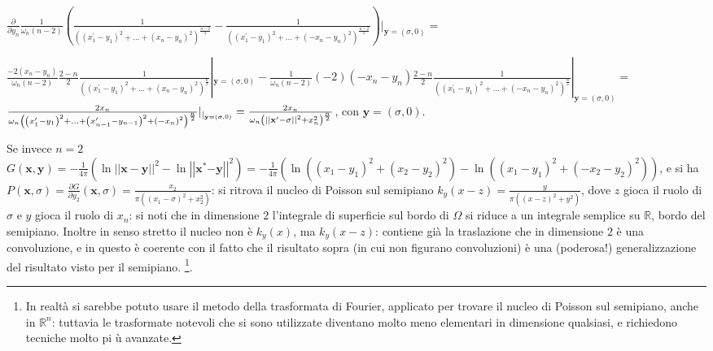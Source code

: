 \documentclass{article}
\begin{document}
$\frac{\partial }{\partial y_{n}}\frac{1}{\omega _{n}\left( n-2\right) }%
\left( \frac{1}{\left( \left( x_{1}^{\prime }-y_{1}\right) ^{2}+...+\left(
x_{n}-y_{n}\right) ^{2}\right) ^{\frac{n-2}{2}}}-\frac{1}{\left( \left(
x_{1}^{\prime }-y_{1}\right) ^{2}+...+\left( -x_{n}-y_{n}\right) ^{2}\right)
^{\frac{n-2}{2}}}\right) |_{\mathbf{y}=\left( \sigma ,0\right) }=$

$\frac{-2\left( x_{n}-y_{n}\right) }{\omega _{n}\left( n-2\right) }\frac{2-n%
}{2}\frac{1}{\left( \left( x_{1}^{\prime }-y_{1}\right) ^{2}+...+\left(
x_{n}-y_{n}\right) ^{2}\right) ^{\frac{n}{2}}}|_{\mathbf{y}=\left( \sigma
,0\right) }-\frac{1}{\omega _{n}\left( n-2\right) }\left( -2\right) \left(
-x_{n}-y_{n}\right) \frac{2-n}{2}\frac{1}{\left( \left( x_{1}^{\prime
}-y_{1}\right) ^{2}+...+\left( -x_{n}-y_{n}\right) ^{2}\right) ^{\frac{n}{2}}%
}|_{\mathbf{y}=\left( \sigma ,0\right) }=$ $\frac{2x_{n}}{\omega _{n}\left(
\left( x_{1}^{\prime }-y_{1}\right) ^{2}+...+\left( x_{n-1}^{\prime
}-y_{n-1}\right) ^{2}+\left( -x_{n}\right) ^{2}\right) ^{\frac{n}{2}}}|_{|_{%
\mathbf{y}=\left( \sigma ,0\right) }}=\frac{2x_{n}}{\omega _{n}\left(
\left\vert \left\vert \mathbf{x}^{\prime }\mathbf{-}\sigma \right\vert
\right\vert ^{2}+x_{n}^{2}\right) ^{\frac{n}{2}}}$, con $\mathbf{y}=\left(
\sigma ,0\right) $.

Se invece $n=2$ $G\left( \mathbf{x,y}\right) =-\frac{1}{4\pi }\left( \ln
\left\vert \left\vert \mathbf{x-y}\right\vert \right\vert ^{2}-\ln
\left\vert \left\vert \mathbf{x}^{\ast }\mathbf{-y}\right\vert \right\vert
^{2}\right) =-\frac{1}{4\pi }\left( \ln \left( \left( x_{1}-y_{1}\right)
^{2}+\left( x_{2}-y_{2}\right) ^{2}\right) -\ln \left( \left(
x_{1}-y_{1}\right) ^{2}+\left( -x_{2}-y_{2}\right) ^{2}\right) \right) $, e
si ha $P\left( \mathbf{x},\sigma \right) =\frac{\partial G}{\partial y_{2}}%
\left( \mathbf{x},\sigma \right) =\frac{x_{2}}{\pi \left( \left(
x_{1}-\sigma \right) ^{2}+x_{2}^{2}\right) }$: si ritrova il nucleo di
Poisson sul semipiano $k_{y}\left( x-z\right) =\frac{y}{\pi \left( \left(
x-z\right) ^{2}+y^{2}\right) }$, dove $z$ gioca il ruolo di $\sigma $ e $y$
gioca il ruolo di $x_{n}$: si noti che in dimensione $2$ l'integrale di
superficie sul bordo di $\Omega $ si riduce a un integrale semplice su $%
\mathbb{R}
$, bordo del semipiano. Inoltre in senso stretto il nucleo non \`{e} $%
k_{y}\left( x\right) $, ma $k_{y}\left( x-z\right) $: contiene gi\`{a} la
traslazione che in dimensione $2$ \`{e} una convoluzione, e in questo \`{e}
coerente con il fatto che il risultato sopra (in cui non figurano
convoluzioni) \`{e} una (poderosa!) generalizzazione del risultato visto per
il semipiano. \footnote{%
In realt\`{a} si sarebbe potuto usare il metodo della trasformata di
Fourier, applicato per trovare il nucleo di Poisson sul semipiano, anche in $%
\mathbb{R}
^{n}$: tuttavia le trasformate notevoli che si sono utilizzate diventano
molto meno elementari in dimensione qualsiasi, e richiedono tecniche molto pi%
\`{u} avanzate.}.
\end{document}
